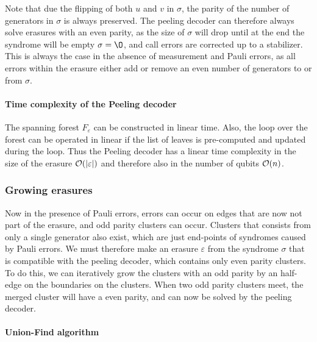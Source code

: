 \noindent Note that due the flipping of both $u$ and $v$ in $\sigma$, the parity of the number of generators in $\sigma$ is always preserved. The peeling decoder can therefore always solve erasures with an even parity, as the size of $\sigma$ will drop until at the end the syndrome will be empty $\sigma = \O$, and call errors are corrected up to a stabilizer. This is always the case in the absence of measurement and Pauli errors, as all errors within the erasure either add or remove an even number of generators to or from $\sigma$.

\paragraph{Time complexity of the Peeling decoder}
The spanning forest $F_\varepsilon$ can be constructed in linear time. Also, the loop over the forest can be operated in linear if the list of leaves is pre-computed and updated during the loop. Thus the Peeling decoder has a linear time complexity in the size of the erasure $\mathcal{O}(\abs{\varepsilon})$ and therefore also in the number of qubits $\mathcal{O}(n)$.

\subsubsection{Growing erasures}

Now in the presence of Pauli errors, errors can occur on edges that are now not part of the erasure, and odd parity clusters can occur. Clusters that consists from only a single generator also exist, which are just end-points of syndromes caused by Pauli errors. We must therefore make an erasure $\varepsilon$ from the syndrome $\sigma$ that is compatible with the peeling decoder, which contains only even parity clusters. To do this, we can iteratively grow the clusters with an odd parity by an half-edge on the boundaries on the clusters. When two odd parity clusters meet, the merged cluster will have a even parity, and can now be solved by the peeling decoder.

\paragraph{Union-Find algorithm}


